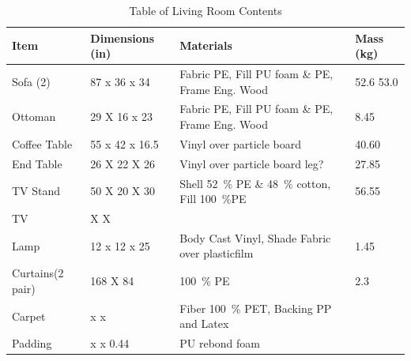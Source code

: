 \documentclass[12pt,oneside]{book}
\begin{document}
\begin{table}[!ht]
	\centering
	\caption{Table of Living Room Contents}
	\label{tab:BRFuel}
	\begin{tabular}{llll}
		\toprule[1.5pt]
		Item 				& Dimensions (in) 	& Materials 										& Mass (kg)  \\
		\midrule
		Sofa (2) 		  	& 87 x 36 x 34  	& Fabric PE, Fill PU foam \& PE, Frame Eng. Wood	& 52.6 53.0      \\
		Ottoman     		& 29 X 16 x 23 		& Fabric PE, Fill PU foam \& PE, Frame Eng. Wood   	& 8.45       \\
		Coffee Table   		& 55 x 42 x 16.5	& Vinyl over particle board  						& 40.60     \\
		End Table      		& 26 X 22 X 26 		& Vinyl over particle board  leg? 					& 27.85     \\	
		TV Stand	 		& 50 X 20 X 30 		& Shell 52~\% PE \& 48~\% cotton, Fill 100~\%PE 	& 56.55   \\	
		TV 					&    X    X 		& 										  			&         \\
		Lamp 				& 12 x 12 x 25		& Body Cast Vinyl, Shade Fabric over plasticfilm	& 1.45  \\
		Curtains(2 pair) 	& 168 X 84 			& 100~\% PE 										& 2.3   \\
		Carpet				&  x  x 			& Fiber 100~\% PET, Backing PP and Latex			&  \\
		Padding				&  x  x 0.44		& PU rebond foam									& 	\\
		\bottomrule[1.25pt]
	\end{tabular}
\end{table}
\end{document}

